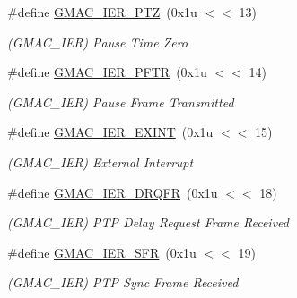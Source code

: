 \begin{DoxyCompactItemize}
\mbox{\label{group__SAMV71__GMAC_ga8bb285f47f78dab1b92528933f2274b2}} 
\#define \mbox{\hyperlink{group__SAMV71__GMAC_ga8bb285f47f78dab1b92528933f2274b2}{G\+M\+A\+C\+\_\+\+I\+E\+R\+\_\+\+P\+TZ}}~(0x1u $<$$<$ 13)
\begin{DoxyCompactList}\small\item\em (G\+M\+A\+C\+\_\+\+I\+ER) Pause Time Zero \end{DoxyCompactList}\item 
\mbox{\label{group__SAMV71__GMAC_ga2b78cbe16974cb9bedecb392103e18dc}} 
\#define \mbox{\hyperlink{group__SAMV71__GMAC_ga2b78cbe16974cb9bedecb392103e18dc}{G\+M\+A\+C\+\_\+\+I\+E\+R\+\_\+\+P\+F\+TR}}~(0x1u $<$$<$ 14)
\begin{DoxyCompactList}\small\item\em (G\+M\+A\+C\+\_\+\+I\+ER) Pause Frame Transmitted \end{DoxyCompactList}\item 
\mbox{\label{group__SAMV71__GMAC_ga3dbf3260c792602c0db9d47c97fa6327}} 
\#define \mbox{\hyperlink{group__SAMV71__GMAC_ga3dbf3260c792602c0db9d47c97fa6327}{G\+M\+A\+C\+\_\+\+I\+E\+R\+\_\+\+E\+X\+I\+NT}}~(0x1u $<$$<$ 15)
\begin{DoxyCompactList}\small\item\em (G\+M\+A\+C\+\_\+\+I\+ER) External Interrupt \end{DoxyCompactList}\item 
\mbox{\label{group__SAMV71__GMAC_ga388530fc53f2ab20530d3467a74e1937}} 
\#define \mbox{\hyperlink{group__SAMV71__GMAC_ga388530fc53f2ab20530d3467a74e1937}{G\+M\+A\+C\+\_\+\+I\+E\+R\+\_\+\+D\+R\+Q\+FR}}~(0x1u $<$$<$ 18)
\begin{DoxyCompactList}\small\item\em (G\+M\+A\+C\+\_\+\+I\+ER) P\+TP Delay Request Frame Received \end{DoxyCompactList}\item 
\mbox{\label{group__SAMV71__GMAC_gad46072573e1c7ecdd4b2aac843abda1d}} 
\#define \mbox{\hyperlink{group__SAMV71__GMAC_gad46072573e1c7ecdd4b2aac843abda1d}{G\+M\+A\+C\+\_\+\+I\+E\+R\+\_\+\+S\+FR}}~(0x1u $<$$<$ 19)
\begin{DoxyCompactList}\small\item\em (G\+M\+A\+C\+\_\+\+I\+ER) P\+TP Sync Frame Received \end{DoxyCompactList}\item 
$$
\end{DoxyCompactItemize}
